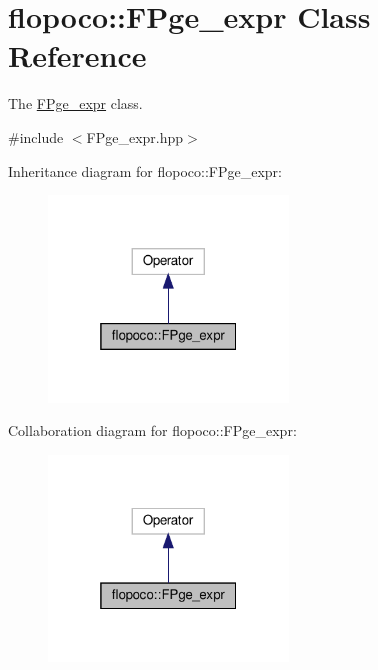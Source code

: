 \hypertarget{classflopoco_1_1FPge__expr}{}\section{flopoco\+:\+:F\+Pge\+\_\+expr Class Reference}
\label{classflopoco_1_1FPge__expr}


The \hyperlink{classflopoco_1_1FPge__expr}{F\+Pge\+\_\+expr} class.  




{\ttfamily \#include $<$F\+Pge\+\_\+expr.\+hpp$>$}



Inheritance diagram for flopoco\+:\+:F\+Pge\+\_\+expr\+:
\nopagebreak
\begin{figure}[H]
\begin{center}
\leavevmode
\includegraphics[width=181pt]{de/d26/classflopoco_1_1FPge__expr__inherit__graph}
\end{center}
\end{figure}


Collaboration diagram for flopoco\+:\+:F\+Pge\+\_\+expr\+:
\nopagebreak
\begin{figure}[H]
\begin{center}
\leavevmode
\includegraphics[width=181pt]{d6/d1a/classflopoco_1_1FPge__expr__coll__graph}
\end{center}
\end{figure}
